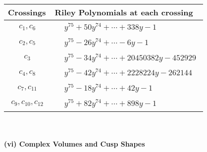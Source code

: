 \documentclass[1p]{elsarticle_modified}
\theoremstyle{definition}
\begin{document}
\begin{tabular}{m{50pt}|m{274pt}}
Crossings & \hspace{64pt}Riley Polynomials at each crossing \\
\hline $$\begin{aligned}c_{1},c_{6}\end{aligned}$$&$\begin{aligned}
&y^{75}+50 y^{74}+\cdots+338 y-1
\end{aligned}$\\
\hline $$\begin{aligned}c_{2},c_{5}\end{aligned}$$&$\begin{aligned}
&y^{75}-26 y^{74}+\cdots-6 y-1
\end{aligned}$\\
\hline $$\begin{aligned}c_{3}\end{aligned}$$&$\begin{aligned}
&y^{75}-34 y^{74}+\cdots+20450382 y-452929
\end{aligned}$\\
\hline $$\begin{aligned}c_{4},c_{8}\end{aligned}$$&$\begin{aligned}
&y^{75}-42 y^{74}+\cdots+2228224 y-262144
\end{aligned}$\\
\hline $$\begin{aligned}c_{7},c_{11}\end{aligned}$$&$\begin{aligned}
&y^{75}-18 y^{74}+\cdots+42 y-1
\end{aligned}$\\
\hline $$\begin{aligned}c_{9},c_{10},c_{12}\end{aligned}$$&$\begin{aligned}
&y^{75}+82 y^{74}+\cdots+898 y-1
\end{aligned}$\\
\hline
\end{tabular}\\~\\
\newpage\flushleft \textbf{(vi) Complex Volumes and Cusp Shapes}
\end{document}
